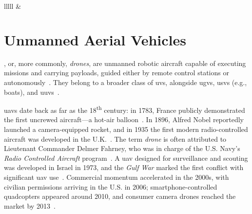 \begin{table}[!hbtp]
{\begin{tabular}{lllll}
   &
   \\ \hline
\end{tabular}%
}
\end{table}

\section{Unmanned Aerial Vehicles}%
\label{sec:unmann-aeri-vehicl}
,  or, more commonly, \emph{drones}, are unmanned
robotic aircraft capable of executing missions and carrying payloads, guided
either by remote control stations or autonomously~\cite{alladi2022UAVBlockain,glossner2021overview}.
They belong to a broader class of \glspl{uv}, alongside \glspl{ugv}, \glspl{usv}
(e.g., boats), and \glspl{uuv}~\cite{glossner2021overview}.

\glspl{uav} date back as far as the 18\textsuperscript{th} century: in 1783,
France publicly demonstrated the first uncrewed aircraft—a hot-air
balloon~\cite{uavHistory}. In 1896, Alfred Nobel reportedly launched a
camera-equipped rocket, and in 1935 the first modern radio-controlled aircraft
was developed in the U.K.~\cite{uavHistory}. The term \emph{drone} is often
attributed to Lieutenant Commander Delmer Fahrney, who was in charge of the U.S.
Navy’s \emph{Radio Controlled Aircraft} program~\cite{uavHistory}. A \gls{uav}
designed for surveillance and scouting was developed in Israel in 1973, and the
\emph{Gulf War} marked the first conflict with significant \gls{uav}
use~\cite{uavHistory}. Commercial momentum accelerated in the 2000s, with
civilian permissions arriving in the U.S. in 2006; smartphone-controlled
quadcopters appeared around 2010, and consumer camera drones reached the market
by 2013~\cite{uavHistory}.

